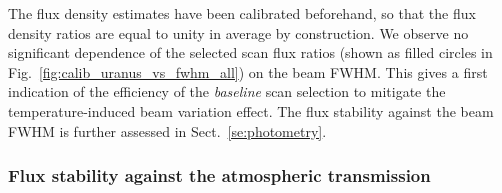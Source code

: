 The flux density estimates have been calibrated beforehand, so that
the flux density ratios are equal to unity in average by construction.
We observe no significant dependence of the selected scan flux ratios
(shown as filled circles in Fig.~\ref{fig:calib_uranus_vs_fwhm_all})
on the beam FWHM. {\lp This gives a first indication of the efficiency
  of the \emph{baseline} scan selection to mitigate the
temperature-induced beam variation effect. The flux stability against
the beam FWHM is further assessed in Sect.~\ref{se:photometry}.}


\subsubsection{Flux stability against the atmospheric transmission}
\label{se:baseline_calibration_atm}

